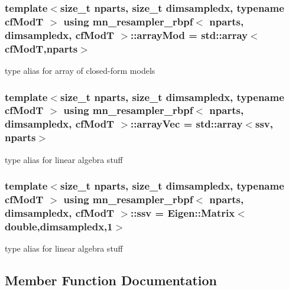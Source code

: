 \subsubsection[{\texorpdfstring{array\+Mod}{arrayMod}}]{\setlength{\rightskip}{0pt plus 5cm}template$<$size\+\_\+t nparts, size\+\_\+t dimsampledx, typename cf\+ModT $>$ using {\bf mn\+\_\+resampler\+\_\+rbpf}$<$ nparts, dimsampledx, cf\+ModT $>$\+::{\bf array\+Mod} =  std\+::array$<$cf\+ModT,nparts$>$}\hypertarget{classmn__resampler__rbpf_adcee7a8490a643233d56f6ba7f1373ee}{}\label{classmn__resampler__rbpf_adcee7a8490a643233d56f6ba7f1373ee}
type alias for array of closed-\/form models 
\subsubsection[{\texorpdfstring{array\+Vec}{arrayVec}}]{\setlength{\rightskip}{0pt plus 5cm}template$<$size\+\_\+t nparts, size\+\_\+t dimsampledx, typename cf\+ModT $>$ using {\bf mn\+\_\+resampler\+\_\+rbpf}$<$ nparts, dimsampledx, cf\+ModT $>$\+::{\bf array\+Vec} =  std\+::array$<${\bf ssv}, nparts$>$}\hypertarget{classmn__resampler__rbpf_ac83764e4eea811b1b76bd2e76de652c9}{}\label{classmn__resampler__rbpf_ac83764e4eea811b1b76bd2e76de652c9}
type alias for linear algebra stuff 
\subsubsection[{\texorpdfstring{ssv}{ssv}}]{\setlength{\rightskip}{0pt plus 5cm}template$<$size\+\_\+t nparts, size\+\_\+t dimsampledx, typename cf\+ModT $>$ using {\bf mn\+\_\+resampler\+\_\+rbpf}$<$ nparts, dimsampledx, cf\+ModT $>$\+::{\bf ssv} =  Eigen\+::\+Matrix$<$double,dimsampledx,1$>$}\hypertarget{classmn__resampler__rbpf_ad5cb01bd12049869984517aa752f6cf6}{}\label{classmn__resampler__rbpf_ad5cb01bd12049869984517aa752f6cf6}
type alias for linear algebra stuff 

\subsection{Member Function Documentation}
